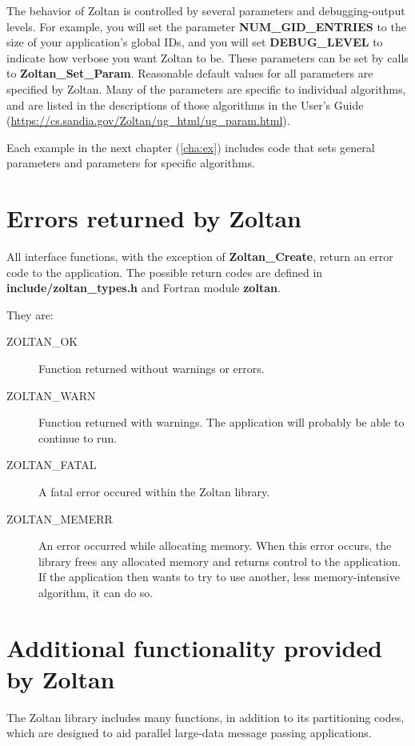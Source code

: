 The behavior of Zoltan is controlled by several parameters and debugging-output 
levels. 
For example, you will set the parameter \textbf{NUM\_GID\_ENTRIES} to the
size of your application's global IDs, and you will set \textbf{DEBUG\_LEVEL}
to indicate how verbose you want Zoltan to be.
These parameters can be set by calls to \textbf{Zoltan\_Set\_Param}. Reasonable 
default values for all parameters are specified by Zoltan. Many of the parameters 
are specific to individual algorithms, and are listed in the descriptions of those 
algorithms in the User's Guide 
(\url{https://cs.sandia.gov/Zoltan/ug\_html/ug\_param.html}).

Each example in the next chapter (\ref{cha:ex}) includes code that sets 
general parameters and parameters for specific algorithms.

\section{Errors returned by Zoltan}

All interface functions, with the exception of \textbf{Zoltan\_Create}, return an 
error code to the application. The possible return codes are defined in 
\textbf{include/zoltan\_types.h} and Fortran module \textbf{zoltan}.

They are:

\begin{description}
\item [ZOLTAN\_OK] Function returned without warnings or errors.
\item [ZOLTAN\_WARN] Function returned with warnings. The application will probably be able to continue to run.
\item [ZOLTAN\_FATAL] A fatal error occured within the Zoltan library.
\item [ZOLTAN\_MEMERR] An error occurred while allocating memory. When this error occurs, the library frees any allocated memory and returns control to the application. If the application then wants to try to use another, less memory-intensive algorithm, it can do so.
\end{description}

\section{Additional functionality provided by Zoltan}

The Zoltan library includes many functions, in addition to its
partitioning codes, which are designed to aid parallel
large-data message passing applications.


